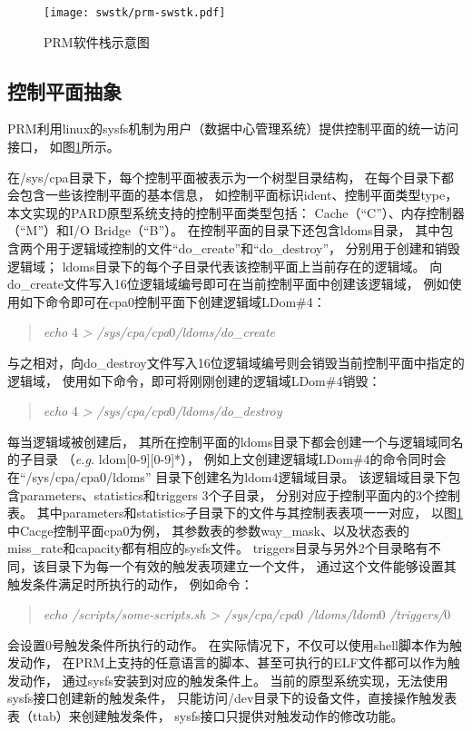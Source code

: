 \begin{figure}[tb]
  \centering
  \texttt{[image: swstk/prm-swstk.pdf]}
  \caption[PRM软件栈示意图]{PRM软件栈示意图}
  \label{fig:prm-swstk}
\end{figure}


\subsection{控制平面抽象}
\label{chap:prm:arch:cpabs}

PRM利用linux的sysfs机制为用户（数据中心管理系统）提供控制平面的统一访问接口，
如图\ref{fig:prm-swstk}所示。

在/sys/cpa目录下，每个控制平面被表示为一个树型目录结构，
在每个目录下都会包含一些该控制平面的基本信息，
如控制平面标识ident、控制平面类型type，
本文实现的PARD原型系统支持的控制平面类型包括：
Cache（``C''）、内存控制器（``M''）和I/O Bridge（``B''）。
在控制平面的目录下还包含ldoms目录，
其中包含两个用于逻辑域控制的文件``do\_create''和``do\_destroy''，
分别用于创建和销毁逻辑域；
ldoms目录下的每个子目录代表该控制平面上当前存在的逻辑域。
向do\_create文件写入16位逻辑域编号即可在当前控制平面中创建该逻辑域，
例如使用如下命令即可在cpa0控制平面下创建逻辑域LDom\#4：
\begin{verse}
\textit{echo} 4 \textit{> /sys/cpa/cpa}0\textit{/ldoms/do\_create}
\end{verse}
与之相对，向do\_destroy文件写入16位逻辑域编号则会销毁当前控制平面中指定的逻辑域，
使用如下命令，即可将刚刚创建的逻辑域LDom\#4销毁：
\begin{verse}
\textit{echo} 4 \textit{> /sys/cpa/cpa}0\textit{/ldoms/do\_destroy}
\end{verse}

每当逻辑域被创建后，
其所在控制平面的ldoms目录下都会创建一个与逻辑域同名的子目录
（\textit{e.g.} ldom[0-9][0-9]*），
例如上文创建逻辑域LDom\#4的命令同时会在``/sys/cpa/cpa0/ldoms''
目录下创建名为ldom4逻辑域目录。
该逻辑域目录下包含parameters、statistics和triggers 3个子目录，
分别对应于控制平面内的3个控制表。
其中parameters和statistics子目录下的文件与其控制表表项一一对应，
以图\ref{fig:prm-swstk}中Cacge控制平面cpa0为例，
其参数表的参数way\_mask、以及状态表的miss\_rate和capacity都有相应的sysfs文件。
triggers目录与另外2个目录略有不同，该目录下为每一个有效的触发表项建立一个文件，
通过这个文件能够设置其触发条件满足时所执行的动作，
例如命令：
\begin{verse}
\textit{echo /scripts/some-scripts.sh > /sys/cpa/cpa}0
\textit{/ldoms/ldom}0
\textit{/triggers/}0
\end{verse}
会设置0号触发条件所执行的动作。
在实际情况下，不仅可以使用shell脚本作为触发动作，
在PRM上支持的任意语言的脚本、甚至可执行的ELF文件都可以作为触发动作，
通过sysfs安装到对应的触发条件上。
当前的原型系统实现，无法使用sysfs接口创建新的触发条件，
只能访问/dev目录下的设备文件，直接操作触发表表（ttab）来创建触发条件，
sysfs接口只提供对触发动作的修改功能。


